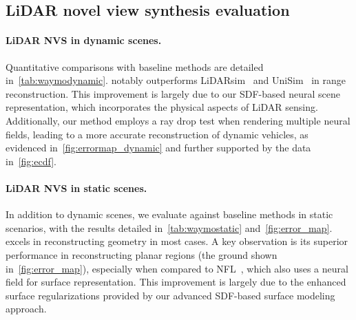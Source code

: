 



\subsection{LiDAR novel view synthesis evaluation} \label{sec:lidar_eval}
\paragraph{LiDAR NVS in dynamic scenes.}

Quantitative comparisons with baseline methods are detailed in~\cref{tab:waymodynamic}. \dynfl notably outperforms LiDARsim~\cite{manivasagam2020lidarsim} and UniSim~\cite{yang2023unisim} in range reconstruction. This improvement is largely due to our SDF-based neural scene representation, which incorporates the physical aspects of LiDAR sensing. Additionally, our method employs a ray drop test when rendering multiple neural fields, leading to a more accurate reconstruction of dynamic vehicles, as evidenced in~\cref{fig:errormap_dynamic} and further supported by the data in~\cref{fig:ecdf}.





\paragraph{LiDAR NVS in static scenes.}
In addition to dynamic scenes, we evaluate \dynfl against baseline methods in static scenarios, with the results detailed in~\cref{tab:waymostatic} and~\cref{fig:error_map}. \dynfl excels in reconstructing geometry in most cases. A key observation is its superior performance in reconstructing planar regions (\eg the ground shown in~\cref{fig:error_map}), especially when compared to NFL~\cite{Huang2023nfl}, which also uses a neural field for surface representation. This improvement is largely due to the enhanced surface regularizations provided by our advanced SDF-based surface modeling approach.



